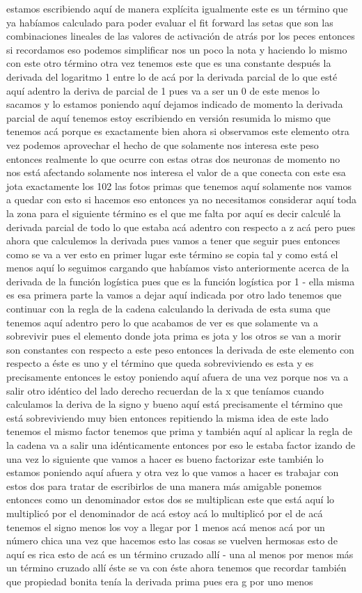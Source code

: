 estamos escribiendo aquí de manera explícita igualmente este es un término que ya habíamos calculado para poder evaluar el fit forward las setas que son las combinaciones lineales de las valores de activación de atrás por los peces entonces si recordamos eso podemos simplificar nos un poco la nota y haciendo lo mismo con este otro término otra vez tenemos este que es una constante después la derivada del logaritmo 1 entre lo de acá por la derivada parcial de lo que esté aquí adentro la deriva de parcial de 1 pues va a ser un 0 de este menos lo sacamos y lo estamos poniendo aquí dejamos indicado de momento la derivada parcial de aquí tenemos estoy escribiendo en versión resumida lo mismo que tenemos acá porque es exactamente bien ahora si observamos este elemento otra vez podemos aprovechar el hecho de que solamente nos interesa este peso entonces realmente lo que ocurre con estas otras dos neuronas de momento no nos está afectando solamente nos interesa el valor de a que conecta con este esa jota exactamente los 102 las fotos primas que tenemos aquí solamente nos vamos a quedar con esto si hacemos eso entonces ya no necesitamos considerar aquí toda la zona para el siguiente término es el que me falta por aquí es decir calculé la derivada parcial de todo lo que estaba acá adentro con respecto a z acá pero pues ahora que calculemos la derivada pues vamos a tener que seguir pues entonces como se va a ver esto en primer lugar este término se copia tal y como está el menos aquí lo seguimos cargando que habíamos visto anteriormente acerca de la derivada de la función logística pues que es la función logística por 1 - ella misma es esa primera parte la vamos a dejar aquí indicada por otro lado tenemos que continuar con la regla de la cadena calculando la derivada de esta suma que tenemos aquí adentro pero lo que acabamos de ver es que solamente va a sobrevivir pues el elemento donde jota prima es jota y los otros se van a morir son constantes con respecto a este peso entonces la derivada de este elemento con respecto a éste es uno y el término que queda sobreviviendo es esta y es precisamente entonces le estoy poniendo aquí afuera de una vez porque nos va a salir otro idéntico del lado derecho recuerdan de la x que teníamos cuando calculamos la deriva de la signo y bueno aquí está precisamente el término que está sobreviviendo muy bien entonces repitiendo la misma idea de este lado tenemos el mismo factor tenemos que prima y también aquí al aplicar la regla de la cadena va a salir una idénticamente entonces por eso le estaba factor izando de una vez lo siguiente que vamos a hacer es bueno factorizar este también lo estamos poniendo aquí afuera y otra vez lo que vamos a hacer es trabajar con estos dos para tratar de escribirlos de una manera más amigable ponemos entonces como un denominador estos dos se multiplican este que está aquí lo multiplicó por el denominador de acá estoy acá lo multiplicó por el de acá tenemos el signo menos los voy a llegar por 1 menos acá menos acá por un número chica una vez que hacemos esto las cosas se vuelven hermosas esto de aquí es rica esto de acá es un término cruzado allí - una al menos por menos más un término cruzado allí éste se va con éste ahora tenemos que recordar también que propiedad bonita tenía la derivada prima pues era g por uno menos 